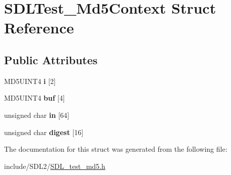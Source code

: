 \hypertarget{struct_s_d_l_test___md5_context}{}\section{S\+D\+L\+Test\+\_\+\+Md5\+Context Struct Reference}
\label{struct_s_d_l_test___md5_context}
\subsection*{Public Attributes}
\begin{DoxyCompactItemize}
\item 
\mbox{\label{struct_s_d_l_test___md5_context_a95b3d5fd74fd1b7a27bf96f3bb32beb4}} 
M\+D5\+U\+I\+N\+T4 {\bfseries i} \mbox{[}2\mbox{]}
\item 
\mbox{\label{struct_s_d_l_test___md5_context_a061f0cead7ec49ac4c5baf0bbd9c13a7}} 
M\+D5\+U\+I\+N\+T4 {\bfseries buf} \mbox{[}4\mbox{]}
\item 
\mbox{\label{struct_s_d_l_test___md5_context_a337638ef799dc0ad9397ea9b175ea388}} 
unsigned char {\bfseries in} \mbox{[}64\mbox{]}
\item 
\mbox{\label{struct_s_d_l_test___md5_context_ab29079997a9f35e5d52c2aac3ad28f90}} 
unsigned char {\bfseries digest} \mbox{[}16\mbox{]}
\end{DoxyCompactItemize}


The documentation for this struct was generated from the following file\+:\begin{DoxyCompactItemize}
\item 
include/\+S\+D\+L2/\hyperlink{_s_d_l__test__md5_8h}{S\+D\+L\+\_\+test\+\_\+md5.\+h}\end{DoxyCompactItemize}

